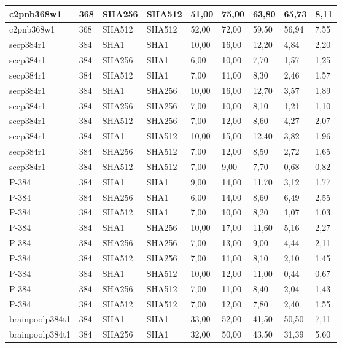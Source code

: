 \begin{longtable}{| l | l | l | l | l |l |l |l |l |}
c2pnb368w1 & 368 & SHA256 & SHA512 & 51,00 & 75,00 & 63,80 & 65,73 & 8,11 \\ \hline 
c2pnb368w1 & 368 & SHA512 & SHA512 & 52,00 & 72,00 & 59,50 & 56,94 & 7,55 \\ \hline 
secp384r1 & 384 & SHA1 & SHA1 & 10,00 & 16,00 & 12,20 & 4,84 & 2,20 \\ \hline 
secp384r1 & 384 & SHA256 & SHA1 & 6,00 & 10,00 & 7,70 & 1,57 & 1,25 \\ \hline 
secp384r1 & 384 & SHA512 & SHA1 & 7,00 & 11,00 & 8,30 & 2,46 & 1,57 \\ \hline 
secp384r1 & 384 & SHA1 & SHA256 & 10,00 & 16,00 & 12,70 & 3,57 & 1,89 \\ \hline 
secp384r1 & 384 & SHA256 & SHA256 & 7,00 & 10,00 & 8,10 & 1,21 & 1,10 \\ \hline 
secp384r1 & 384 & SHA512 & SHA256 & 7,00 & 12,00 & 8,60 & 4,27 & 2,07 \\ \hline 
secp384r1 & 384 & SHA1 & SHA512 & 10,00 & 15,00 & 12,40 & 3,82 & 1,96 \\ \hline 
secp384r1 & 384 & SHA256 & SHA512 & 7,00 & 12,00 & 8,50 & 2,72 & 1,65 \\ \hline 
secp384r1 & 384 & SHA512 & SHA512 & 7,00 & 9,00 & 7,70 & 0,68 & 0,82 \\ \hline 
P-384 & 384 & SHA1 & SHA1 & 9,00 & 14,00 & 11,70 & 3,12 & 1,77 \\ \hline 
P-384 & 384 & SHA256 & SHA1 & 6,00 & 14,00 & 8,60 & 6,49 & 2,55 \\ \hline 
P-384 & 384 & SHA512 & SHA1 & 7,00 & 10,00 & 8,20 & 1,07 & 1,03 \\ \hline 
P-384 & 384 & SHA1 & SHA256 & 10,00 & 17,00 & 11,60 & 5,16 & 2,27 \\ \hline 
P-384 & 384 & SHA256 & SHA256 & 7,00 & 13,00 & 9,00 & 4,44 & 2,11 \\ \hline 
P-384 & 384 & SHA512 & SHA256 & 7,00 & 11,00 & 8,10 & 2,10 & 1,45 \\ \hline 
P-384 & 384 & SHA1 & SHA512 & 10,00 & 12,00 & 11,00 & 0,44 & 0,67 \\ \hline 
P-384 & 384 & SHA256 & SHA512 & 7,00 & 11,00 & 8,40 & 2,04 & 1,43 \\ \hline 
P-384 & 384 & SHA512 & SHA512 & 7,00 & 12,00 & 7,80 & 2,40 & 1,55 \\ \hline 
brainpoolp384t1 & 384 & SHA1 & SHA1 & 33,00 & 52,00 & 41,50 & 50,50 & 7,11 \\ \hline 
brainpoolp384t1 & 384 & SHA256 & SHA1 & 32,00 & 50,00 & 43,50 & 31,39 & 5,60 \\ \hline 

\end{longtable}
